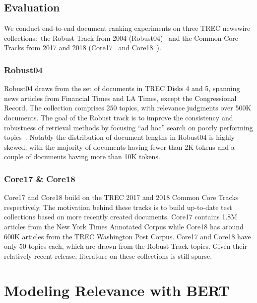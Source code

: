 \subsection{Evaluation}

We conduct end-to-end document ranking experiments on three TREC newswire collections:\ the Robust Track from 2004 (Robust04)~\cite{Voorhees_TREC2004_robust} and the Common Core Tracks from 2017 and 2018 (Core17~\cite{allan2017trec} and Core18~\cite{core2018trec}).

\subsubsection{Robust04}

Robust04 draws from the set of documents in TREC Disks 4 and 5, spanning news articles from Financial Times and LA Times, except the Congressional Record.
The collection comprises 250 topics, with relevance judgments over 500K documents.
The goal of the Robust track is to improve the consistency and robustness of retrieval methods by focusing ``ad hoc'' search on poorly performing topics~\cite{Voorhees_TREC2004_robust}.
Notably the distribution of document lengths in Robust04 is highly skewed, with the majority of documents having fewer than 2K tokens and a couple of documents having more than 10K tokens.

\subsubsection{Core17 \& Core18}

Core17 and Core18 build on the TREC 2017 and 2018 Common Core Tracks respectively.
The motivation behind these tracks is to build up-to-date test collections based on more recently created documents.
Core17 contains 1.8M articles from the New York Times Annotated Corpus while Core18 has around 600K articles from the TREC Washington Post Corpus.
Core17 and Core18 have only 50 topics each, which are drawn from the Robust Track topics.
Given their relatively recent release, literature on these collections is still sparse.

\section{Modeling Relevance with BERT}


